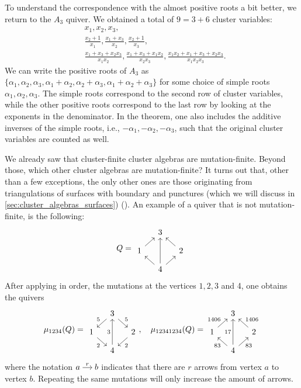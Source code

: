 To understand the correspondence with the almost positive roots a bit better, we return
to the $A_3$ quiver. We obtained a total of $9 = 3 + 6$ cluster variables:
\begin{align*}
	 & x_1, x_2, x_3,                                                                                               \\
	 & \frac{x_2 + 1}{x_1}, \frac{x_1 + x_3}{x_2}, \frac{x_2 + 1}{x_3},                                             \\
	 & \frac{x_1+x_3+x_2x_3}{x_1x_2}, \frac{x_1+x_3+x_1x_2}{x_2x_3}, \frac{x_1x_2 + x_1 + x_3 + x_2x_3}{x_1x_2x_3}.
\end{align*}
We can write the positive roots of $A_3$ as $\{\alpha_1, \alpha_2, \alpha_3, \alpha_1 + \alpha_2, \alpha_2 + \alpha_3, \alpha_1 + \alpha_2 + \alpha_3\}$ for some choice of simple roots $\alpha_1, \alpha_2, \alpha_3$. The simple roots correspond to the second row of cluster variables, while the other positive roots correspond to the last row by looking at the exponents in the denominator. In the theorem, one also includes the additive inverses of the simple roots, i.e., $-\alpha_1, -\alpha_2, -\alpha_3$, such that the original cluster variables are counted as well.

We already saw that cluster-finite cluster algebras are mutation-finite. Beyond those,
which other cluster algebras are mutation-finite? It turns out that, other than a few
exceptions, the only other ones are those originating from triangulations of surfaces
with boundary and punctures (which we will discuss in
\cref{sec:cluster_algebras_surfaces}) (\cite{FeliksonShapiroTumarkin2012SkewSCA}). An
example of a quiver that is not mutation-finite, is the following:
\begin{equation*}
	Q =
	\begin{tikzcd}[sep = small]
		& 3 & \\
		1 \urar &&2 \ular \\
		& 4 \ular \ar[uu] \urar
	\end{tikzcd}
\end{equation*}
%
After applying in order, the mutations at the vertices $1,2,3$ and 4, one obtains the
quivers
\begin{equation*}
	\mu_{1234}(Q) =
	\begin{tikzcd}[sep = small]
		& 3 & \\
		1 \urar[leftarrow, "5"] &&2 \ular[leftarrow, "5"'] \\
		& 4 \ular[leftarrow, "2"] \ar[uu, "3"] \urar[leftarrow, "2"']
	\end{tikzcd}
	,\quad \mu_{12341234}(Q) =
	\begin{tikzcd}[sep = small]
		& 3 & \\
		1 \urar["1406"] &&2 \ular["1406"'] \\
		& 4 \ular["83"] \ar[uu, "17"] \urar["83"']
	\end{tikzcd}
\end{equation*}
%
where the notation $\begin{tikzcd}[cramped, sep=small]
		a \ar[r, "r"] &b
	\end{tikzcd}$ indicates that there are $r$ arrows from vertex $a$ to vertex $b$. Repeating the same mutations will only increase the amount of arrows.

